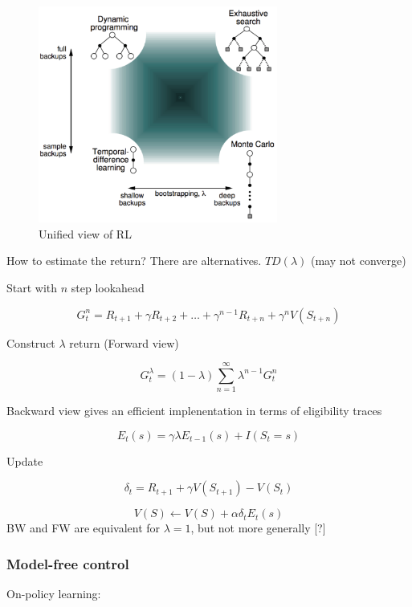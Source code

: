 \documentclass[english]{article}
\begin{document}
    \begin{figure}
        \centering
\includegraphics[width=0.7\textwidth]{uni_rl.png}
\caption{Unified view of RL}
\label{Unified view of RL}
    \end{figure}

\item How to estimate the return? There are alternatives. $TD(\lambda)$ (may not converge)

Start with $n$ step lookahead 

$$G_t^n = R_{t+1}+\gamma R_{t+2} +\ldots + \gamma^{n-1} R_{t+n}
+\gamma^n V(S_{t+n})
$$

Construct $\lambda$ return (Forward view)

$$G_t^\lambda = (1-\lambda) \sum_{n=1}^\infty \lambda^{n-1} G_t^n
$$

Backward view gives an efficient implenentation in terms of eligibility traces

$$E_t(s) = \gamma \lambda E_{t-1}(s)
+I(S_t=s)
$$

Update

$$\delta_t = R_{t+1}+\gamma V(S_{t+1}) - V(S_{t})
$$

$$V(S) \gets V(S)+\alpha \delta_t E_t(s)$$ 
BW and FW are equivalent for $\lambda=1$, but not more generally [?]



\eenum 


\subsubsection{Model-free control}
\benum

\item On-policy learning: 
\end{document}
